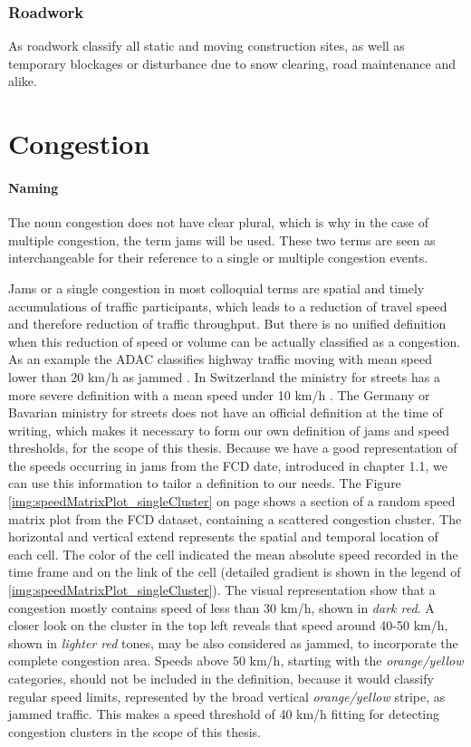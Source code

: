 \documentclass[a4paper,12pt]{report}
\begin{document}
	\subsubsection{Roadwork}
		As roadwork classify all static and moving construction sites, as well as temporary blockages or disturbance due to snow clearing, road maintenance and alike. 
	
\section{Congestion}
\label{definition_congestion}
\paragraph{Naming} The noun congestion does not have clear plural, which is why in the case of multiple congestion, the term jams will be used. These two terms are seen as interchangeable for their reference to a single or multiple congestion events.
\par Jams or a single congestion in most colloquial terms are spatial and timely accumulations of traffic participants, which leads to a reduction of travel speed and therefore reduction of traffic throughput. But there is no unified definition when this reduction of speed or volume can be actually classified as a congestion. As an example the ADAC classifies highway traffic moving with mean speed lower than 20 km/h as jammed \cite{ADAC2019}. In Switzerland the ministry for streets has a more severe definition with a mean speed under 10 km/h \cite{ASTRA2020}. The Germany or Bavarian ministry for streets does not have an official definition at the time of writing, which makes it necessary to form our own definition of jams and speed thresholds, for the scope of this thesis. Because we have a good representation of the speeds occurring in jams from the FCD date, introduced in chapter 1.1, we can use this information to tailor a definition to our needs. The Figure \ref{img:speedMatrixPlot_singleCluster} on page \pageref{img:speedMatrixPlot_singleCluster} shows a section of a random speed matrix plot from the FCD dataset, containing a scattered congestion cluster. The horizontal and vertical extend represents the spatial and temporal location of each cell. The color of the cell indicated the mean absolute speed recorded in the time frame and on the link of the cell (detailed gradient is shown in the legend of \ref{img:speedMatrixPlot_singleCluster}). The visual representation show that a congestion mostly contains speed of less than 30 km/h, shown in \textit{dark red}. A closer look on the cluster in the top left reveals that speed around 40-50 km/h, shown in \textit{lighter red} tones, may be also considered as jammed, to incorporate the complete congestion area. Speeds above 50 km/h, starting with the \textit{orange/yellow} categories, should not be included in the definition, because it would classify regular speed limits, represented by the broad vertical \textit{orange/yellow} stripe, as jammed traffic. This makes a speed threshold of 40 km/h fitting for detecting congestion clusters in the scope of this thesis.
\end{document}
